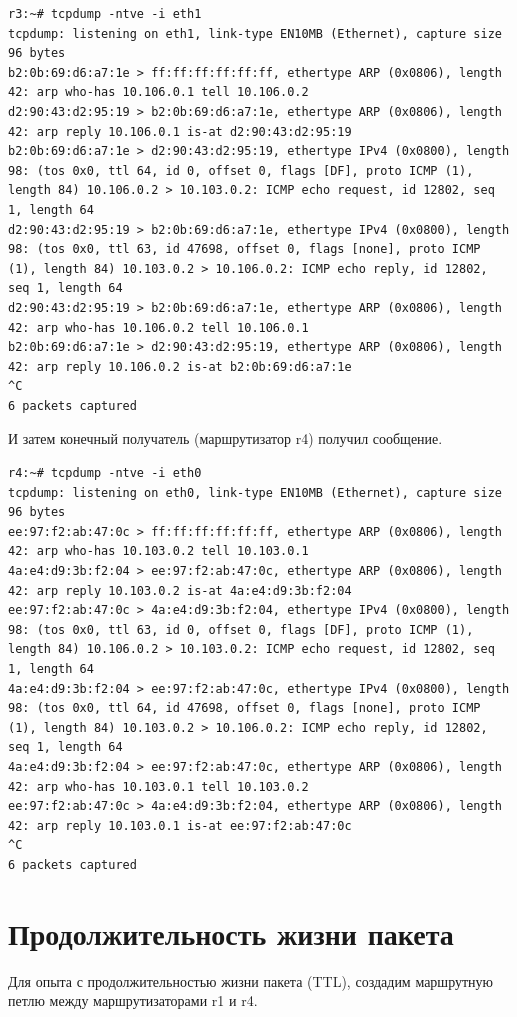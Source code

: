 \documentclass[a4paper,12pt]{article}
\begin{document}
\begin{Verbatim}
r3:~# tcpdump -ntve -i eth1
tcpdump: listening on eth1, link-type EN10MB (Ethernet), capture size 96 bytes
b2:0b:69:d6:a7:1e > ff:ff:ff:ff:ff:ff, ethertype ARP (0x0806), length 42: arp who-has 10.106.0.1 tell 10.106.0.2
d2:90:43:d2:95:19 > b2:0b:69:d6:a7:1e, ethertype ARP (0x0806), length 42: arp reply 10.106.0.1 is-at d2:90:43:d2:95:19
b2:0b:69:d6:a7:1e > d2:90:43:d2:95:19, ethertype IPv4 (0x0800), length 98: (tos 0x0, ttl 64, id 0, offset 0, flags [DF], proto ICMP (1), length 84) 10.106.0.2 > 10.103.0.2: ICMP echo request, id 12802, seq 1, length 64
d2:90:43:d2:95:19 > b2:0b:69:d6:a7:1e, ethertype IPv4 (0x0800), length 98: (tos 0x0, ttl 63, id 47698, offset 0, flags [none], proto ICMP (1), length 84) 10.103.0.2 > 10.106.0.2: ICMP echo reply, id 12802, seq 1, length 64
d2:90:43:d2:95:19 > b2:0b:69:d6:a7:1e, ethertype ARP (0x0806), length 42: arp who-has 10.106.0.2 tell 10.106.0.1
b2:0b:69:d6:a7:1e > d2:90:43:d2:95:19, ethertype ARP (0x0806), length 42: arp reply 10.106.0.2 is-at b2:0b:69:d6:a7:1e
^C
6 packets captured
\end{Verbatim}

И затем конечный получатель (маршрутизатор r4) получил сообщение.

\begin{Verbatim}
r4:~# tcpdump -ntve -i eth0
tcpdump: listening on eth0, link-type EN10MB (Ethernet), capture size 96 bytes
ee:97:f2:ab:47:0c > ff:ff:ff:ff:ff:ff, ethertype ARP (0x0806), length 42: arp who-has 10.103.0.2 tell 10.103.0.1
4a:e4:d9:3b:f2:04 > ee:97:f2:ab:47:0c, ethertype ARP (0x0806), length 42: arp reply 10.103.0.2 is-at 4a:e4:d9:3b:f2:04
ee:97:f2:ab:47:0c > 4a:e4:d9:3b:f2:04, ethertype IPv4 (0x0800), length 98: (tos 0x0, ttl 63, id 0, offset 0, flags [DF], proto ICMP (1), length 84) 10.106.0.2 > 10.103.0.2: ICMP echo request, id 12802, seq 1, length 64
4a:e4:d9:3b:f2:04 > ee:97:f2:ab:47:0c, ethertype IPv4 (0x0800), length 98: (tos 0x0, ttl 64, id 47698, offset 0, flags [none], proto ICMP (1), length 84) 10.103.0.2 > 10.106.0.2: ICMP echo reply, id 12802, seq 1, length 64
4a:e4:d9:3b:f2:04 > ee:97:f2:ab:47:0c, ethertype ARP (0x0806), length 42: arp who-has 10.103.0.1 tell 10.103.0.2
ee:97:f2:ab:47:0c > 4a:e4:d9:3b:f2:04, ethertype ARP (0x0806), length 42: arp reply 10.103.0.1 is-at ee:97:f2:ab:47:0c
^C
6 packets captured
\end{Verbatim}

\section{Продолжительность жизни пакета} 
Для опыта с продолжительностью жизни пакета (TTL), создадим маршрутную петлю между маршрутизаторами r1 и r4. 
\end{document}
